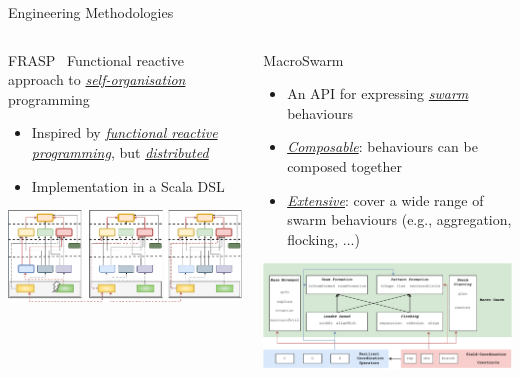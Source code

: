 \documentclass[presentation, 9pt, aspectratio=169]{beamer}\mode<presentation>{\usetheme{AMSBolognaFC}}
\begin{document}
\begin{frame}{Engineering Methodologies}
\vspace{-0.5cm}
\begin{columns}[t]
\begin{column}{0.31\textwidth}
\begin{exampleblock}{FRASP~\cite{frasp}}
\footnotesize{
  Functional reactive approach to \emph{\underline{self-organisation}} programming
}
\begin{itemize}
  \item Inspired by \emph{\underline{functional reactive programming}}, but \emph{\underline{distributed}}
  \item Implementation in a Scala DSL
\end{itemize}
\includegraphics[width=\textwidth]{img/interactions.pdf}
\end{exampleblock}
\end{column}
\begin{column}{0.31\textwidth}
\begin{exampleblock}{MacroSwarm~\cite{macroswarm}}
\footnotesize{
  \begin{itemize}
  \item An API for expressing \underline{\emph{swarm}} behaviours
  \item \emph{\underline{Composable}}: behaviours can be composed together
  \item \emph{\underline{Extensive}}: cover a wide range of swarm behaviours (e.g., aggregation, flocking, ...)
\end{itemize}
}
\includegraphics[width=\textwidth]{img/architecture-macro.drawio.pdf}

\end{exampleblock}
\end{column}
\end{columns}
\end{frame}
\end{document}
